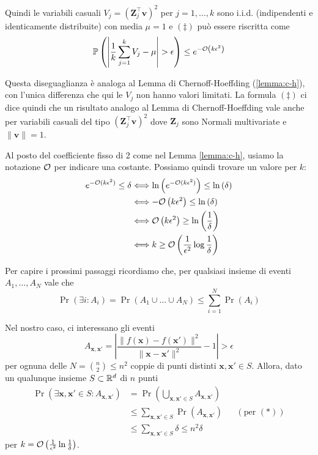 Quindi le variabili casuali $V_j = \left(\bm Z_j^\top \bm v \right)^2$ per $j = 1, \dots, k$ sono i.i.d. (indipendenti e identicamente distribuite) con media $\mu = 1$ e $(\ddag)$ può essere riscritta come
$$ \mathbb{P} \left(\left|\frac{1}{k} \sum_{j = 1}^k V_j - \mu \right| > \epsilon \right) \leq e^{- \mathcal{O} \left(k \epsilon^2 \right)} $$

Questa diseguaglianza è analoga al Lemma di Chernoff-Hoeffding (\ref{lemma:c-h}), con l'unica differenza che qui le $V_j$ non hanno valori limitati. La formula $(\ddag)$ ci dice quindi che un risultato analogo al Lemma di Chernoff-Hoeffding vale anche per variabili casuali del tipo $\left(\bm Z_j^\top \bm v\right)^2$ dove $\bm Z_j$ sono Normali multivariate e $\|\bm v\| = 1$.

Al posto del coefficiente fisso di 2 come nel Lemma \ref{lemma:c-h}, usiamo la notazione $\mathcal{O}$ per indicare una costante. Possiamo quindi trovare un valore per $k$:
\begin{align*}
    e^{-\mathcal{O}(k\epsilon^2)} \leq \delta & \Longleftrightarrow \ln \left(e^{-\mathcal{O}(k \epsilon^2)} \right) \leq \ln \left(\delta\right) \\
    & \Longleftrightarrow - \mathcal{O} \left(k \epsilon^2\right) \leq \ln \left(\delta\right) \\
    & \Longleftrightarrow \mathcal{O} \left(k \epsilon^2\right) \geq \ln \left(\frac{1}{\delta}\right) \\
    & \Longleftrightarrow k \geq \mathcal{O} \left(\frac{1}{\epsilon^2} \log \frac{1}{\delta}\right)
\end{align*}

Per capire i prossimi passaggi ricordiamo che, per qualsiasi insieme di eventi $A_1, \dots, A_N$ vale che
\[
\Pr \left(\exists i : A_i \right) = \Pr \left(A_1 \cup \dots \cup A_N \right) \leq \sum_{i = 1}^N \Pr \left(A_i\right)
\tag*{($\ast$)}
\]

Nel nostro caso, ci interessano gli eventi
$$ A_{\bm x, \bm x'} = \left|\frac{\|f(\bm x) - f(\bm x')\|^2}{\|\bm x - \bm x'\|^2} - 1\right| > \epsilon $$
per ognuna delle $N = \binom{n}{2} \leq n^2$ coppie di punti distinti $\bm x, \bm x' \in S$. Allora, dato un qualunque insieme $S \subset \mathbb{R}^d$ di $n$ punti
\begin{align*}
    \Pr \left(\exists \bm x, \bm x' \in S : A_{\bm x, \bm x'}\right) & = \Pr \left(\bigcup_{\bm x, \bm x' \in S} A_{\bm x, \bm x'}\right) \\
    & \leq \sum_{\bm x, \bm x' \in S} \Pr \left(A_{\bm x, \bm x'}\right) && (\text{per } (\ast)) \\
    & \leq \sum_{\bm x, \bm x' \in S} \delta \leq n^2 \delta
\end{align*}
per $k = \mathcal{O} \left(\frac{1}{\epsilon^2} \ln \frac{1}{\delta}\right)$.


